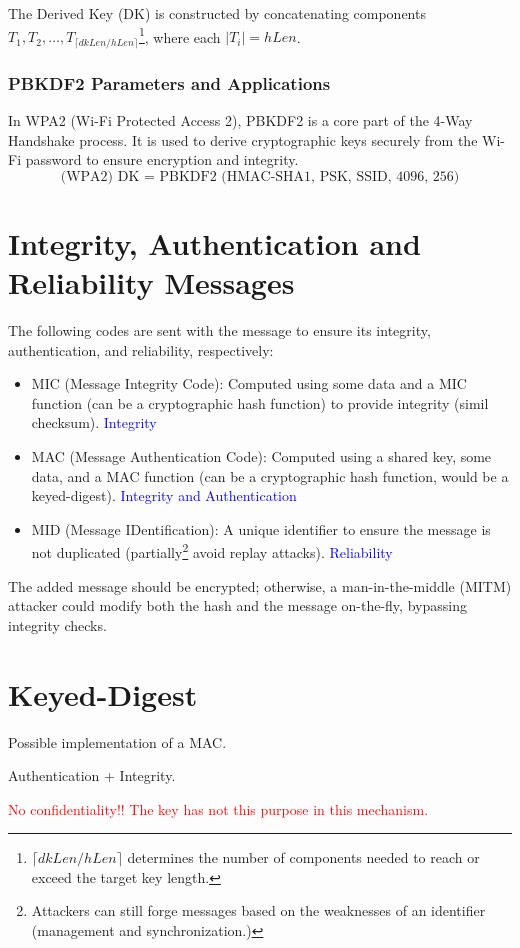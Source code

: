 The Derived Key (DK) is constructed by concatenating components $T_1, T_2, \dots, T_{\lceil dkLen/hLen \rceil}$\footnote{$\lceil dkLen / hLen \rceil$  determines the number of components needed to reach or exceed the target key length.}, where each $|T_i| = hLen$.

\subsubsection*{PBKDF2 Parameters and Applications}
In WPA2 (Wi-Fi Protected Access 2), PBKDF2 is a core part of the 4-Way Handshake process. It is used to derive cryptographic keys securely from the Wi-Fi password to ensure encryption and integrity.
\[
    \text{(WPA2) DK = PBKDF2 (HMAC-SHA1, PSK, SSID, 4096, 256)}
\]

\clearpage
\section{Integrity, Authentication and Reliability Messages}
The following codes are sent with the message to ensure its integrity, authentication, and reliability, respectively:
\begin{itemize}
    \item MIC (Message Integrity Code): Computed using some data and a MIC function (can be a cryptographic hash function) to provide integrity (simil checksum). \textcolor{Blue}{Integrity}
    \item MAC (Message Authentication Code): Computed using a shared key, some data, and a MAC function (can be a cryptographic hash function, would be a keyed-digest). \textcolor{Blue}{Integrity and Authentication}
    \item MID (Message IDentification): A unique identifier to ensure the message is not duplicated (partially\footnote{Attackers can still forge messages based on the weaknesses of an identifier (management and synchronization.)} avoid replay attacks). \textcolor{Blue}{Reliability}
\end{itemize}

\begin{tcolorbox}[colback=red!10!white, colframe=red!70!black, coltitle=white, title=Beware]
    The added message should be encrypted; otherwise, a man-in-the-middle (MITM) attacker could modify both the hash and the message on-the-fly, bypassing integrity checks.
\end{tcolorbox}

\section{Keyed-Digest}
\begin{center}
    Possible implementation of a MAC.

    Authentication + Integrity.
\end{center}
\textcolor{Red}{No confidentiality!! The key has not this purpose in this mechanism.}

